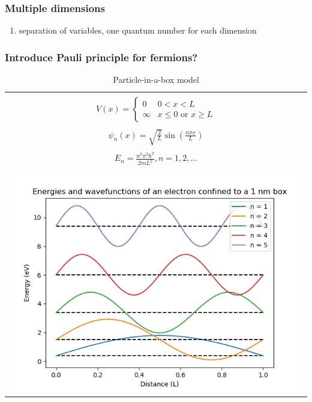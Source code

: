 \documentclass[11pt]{article}
\begin{document}
\subsubsection{Multiple dimensions}
\label{sec:orga687853}
\begin{enumerate}
\item separation of variables, one quantum number for each dimension
\end{enumerate}
\subsubsection{Introduce Pauli principle for fermions?}
\label{sec:orgd4ee4ef}

\begin{table}[tb]
   \begin{center}
   \caption{Particle-in-a-box model}
    \label{Particle-in-a-box}
\begin{tabular}[h]{|c|}
\hline
 \\
$\displaystyle       V(x) = \left \{
        \begin{array}{rl}
          0 & 0 < x < L \\
          \infty & x \leq 0 \text{ or } x \geq L
        \end{array} \right . $ \\
 \\
$\displaystyle     \psi_n(x) =\sqrt{\frac{2}{L}} \sin \left ( \frac{n\pi x}{L} \right )$
\\ 
 \\
$\displaystyle     E_n =\frac{n^2\pi^2\hbar^2}{2mL^2}, n = 1, 2, ...$ \\
 \\
     \includegraphics[scale=.5]{Images/PIAB.png} \\       
\hline
\end{tabular}
 \end{center}
\end{table}
\end{document}
